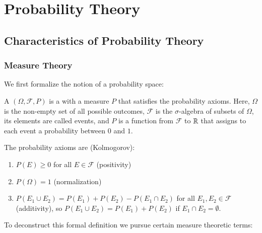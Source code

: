 \documentclass[12pt, a4paper, oneside, openright, titlepage]{book}
\begin{document}
\part{Probability Theory}


\chapter{Characteristics of Probability Theory}

\section{Measure Theory}

We first formalize the notion of a probability space:

\begin{defn}
    A  $(\Omega, \mathcal{F}, P)$ is a  with a measure $P$ that satisfies the probability axioms. Here, $\Omega$ is the non-empty set of all possible outcomes, $\mathcal{F}$ is the $\sigma$-algebra of subsets of $\Omega$, its elements are called events, and $P$ is a function from $\mathcal{F}$ to $\mathbb R$ that assigns to each event a probability between $0$ and $1$.

    The probability axioms are (Kolmogorov):
    \begin{enumerate}
        \item $P(E) \geq 0$ for all $E \in \mathcal{F}$ (positivity)
        \item $P(\Omega) = 1$ (normalization)
        \item $P(E_1\cup E_2) = P(E_1) + P(E_2) - P(E_1\cap E_2)$ for all $E_1,E_2 \in \mathcal{F}$ (additivity), so $P(E_1\cup E_2) = P(E_1)+P(E_2)$ if $E_1\cap E_2 = \emptyset$.
    \end{enumerate}
\end{defn}

To deconstruct this formal definition we pursue certain measure theoretic terms:
\end{document}
